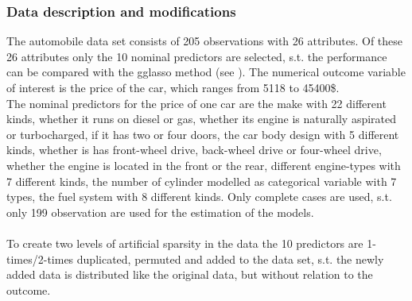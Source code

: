 \documentclass[12pt,letterpaper]{article}
\numberwithin{equation}{subsection}
\begin{document}
\subsubsection{Data description and modifications}
\label{sec:amdd}
The automobile data set consists of 205 observations with 26 attributes. Of these 26 attributes only the 10 nominal predictors are selected, s.t. the performance can be compared with the gglasso method (see \cite{gglasso}). The numerical outcome variable of interest is the price of the car, which ranges from 5118 to 45400\$. \\The nominal predictors for the price of one car are the make with 22 different kinds, whether it runs on diesel or gas, whether its engine is naturally aspirated or turbocharged, if  it has two or four doors, the car body design with 5 different kinds, whether is has front-wheel drive, back-wheel drive or four-wheel drive, whether the engine is located in the front or the rear, different engine-types with 7 different kinds, the number of cylinder modelled as categorical variable with 7 types, the fuel system with 8 different kinds. Only complete cases are used, s.t. only 199 observation are used for the estimation of the models.\\ \\
To create two levels of artificial sparsity in the data the 10 predictors are 1-times/2-times duplicated, permuted and added to the data set, s.t. the newly added data is distributed like the original data, but without relation to the outcome.
\end{document}
